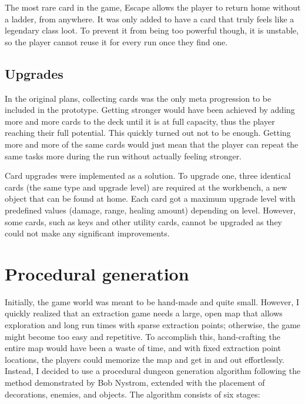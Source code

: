 The most rare card in the game, Escape allows the player to return home without a ladder, from anywhere. It was only added to have a card that truly feels like a legendary class loot. To prevent it from being too powerful though, it is unstable, so the player cannot reuse it for every run once they find one.



\subsection{Upgrades}

In the original plans, collecting cards was the only meta progression to be included in the prototype. Getting stronger would have been achieved by adding more and more cards to the deck until it is at full capacity, thus the player reaching their full potential. This quickly turned out not to be enough. Getting more and more of the same cards would just mean that the player can repeat the same tasks more during the run without actually feeling stronger.

Card upgrades were implemented as a solution. To upgrade one, three identical cards (the same type and upgrade level) are required at the workbench, a new object that can be found at home. Each card got a maximum upgrade level with predefined values (damage, range, healing amount) depending on level. However, some cards, such as keys and other utility cards, cannot be upgraded as they could not make any significant improvements.



\section{Procedural generation} \label{Section:ProceduralGeneration}

Initially, the game world was meant to be hand-made and quite small. However, I quickly realized that an extraction game needs a large, open map that allows exploration and long run times with sparse extraction points; otherwise, the game might become too easy and repetitive. To accomplish this, hand-crafting the entire map would have been a waste of time, and with fixed extraction point locations, the players could memorize the map and get in and out effortlessly. Instead, I decided to use a procedural dungeon generation algorithm following the method demonstrated by Bob Nystrom\cite{nystromProcedural2014}, extended with the placement of decorations, enemies, and objects. The algorithm consists of six stages:

